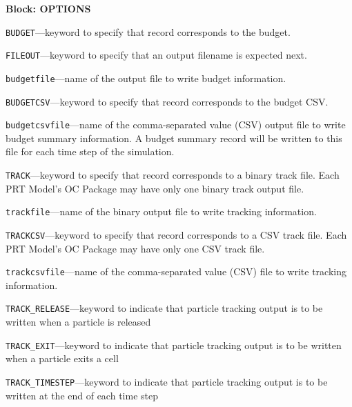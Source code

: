 
\item \textbf{Block: OPTIONS}

\begin{description}
\item \texttt{BUDGET}---keyword to specify that record corresponds to the budget.

\item \texttt{FILEOUT}---keyword to specify that an output filename is expected next.

\item \texttt{budgetfile}---name of the output file to write budget information.

\item \texttt{BUDGETCSV}---keyword to specify that record corresponds to the budget CSV.

\item \texttt{budgetcsvfile}---name of the comma-separated value (CSV) output file to write budget summary information.  A budget summary record will be written to this file for each time step of the simulation.

\item \texttt{TRACK}---keyword to specify that record corresponds to a binary track file.  Each PRT Model's OC Package may have only one binary track output file.

\item \texttt{trackfile}---name of the binary output file to write tracking information.

\item \texttt{TRACKCSV}---keyword to specify that record corresponds to a CSV track file.  Each PRT Model's OC Package may have only one CSV track file.

\item \texttt{trackcsvfile}---name of the comma-separated value (CSV) file to write tracking information.

\item \texttt{TRACK\_RELEASE}---keyword to indicate that particle tracking output is to be written when a particle is released

\item \texttt{TRACK\_EXIT}---keyword to indicate that particle tracking output is to be written when a particle exits a cell

\item \texttt{TRACK\_TIMESTEP}---keyword to indicate that particle tracking output is to be written at the end of each time step


\end{description}
